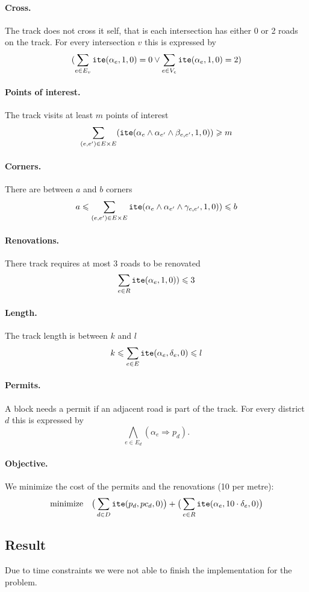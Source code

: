 \paragraph{Cross.}
The track does not cross it self, that is each intersection has either 0 or 2 roads on the track.
For every intersection $v$ this is expressed by
\[
(\sum_{e \in E_v} \mathtt{ite}(\alpha_e,1,0) = 0 \vee \sum_{e \in V_e} \mathtt{ite}(\alpha_e,1,0) = 2)
\]

\paragraph{Points of interest.}
The track visits at least $m$ points of interest
\[
\sum_{(e,e') \in E \times E}(\mathtt{ite}(\alpha_{e} \wedge \alpha_{e'} \wedge \beta_{e,e'},1,0)) \geqslant m
\]

\paragraph{Corners.}
There are between $a$ and $b$ corners
\[
a \leqslant \sum_{(e,e') \in E \times E} \mathtt{ite}(\alpha_{e} \wedge \alpha_{e'} \wedge \gamma_{e,e'},1,0)) \leqslant b
\]

\paragraph{Renovations.}
There track requires at most $3$ roads to be renovated
\[
\sum_{e\in R } \mathtt{ite}(\alpha_{e} ,1,0)) \leqslant 3
\]

\paragraph{Length.}
The track length is between $k$ and $l$
\[
k \leqslant \sum_{e \in E} \mathtt{ite}(\alpha_{e} ,\delta_{e},0) \leqslant l
\]

\paragraph{Permits.}
A block needs a permit if an adjacent road is part of the track.
For every district $d$ this is expressed by
\[
  \bigwedge_{e \in E_d} (\alpha_e \Rightarrow p_d).
\]

\paragraph{Objective.}
We minimize the cost of the permits and the renovations (10 per metre):
\[
 \text{minimize} \quad
 \big( \sum_{d \in D} \mathtt{ite}(p_d,pc_d,0) \big) + 
 \big( \sum_{e \in R} \mathtt{ite}(\alpha_e,10 \cdot \delta_e,0)\big)
\]



\subsection{Result}
Due to time constraints we were not able to finish the implementation for the problem.

\endgroup
